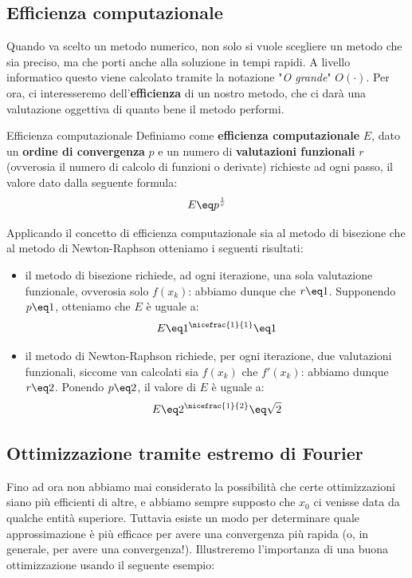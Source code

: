 \subsection{Efficienza computazionale}

Quando va scelto un metodo numerico, non solo si vuole scegliere un metodo che sia preciso, ma che porti anche alla soluzione in tempi rapidi. A livello informatico questo viene calcolato tramite la notazione "\textit{O grande}" $O(\cdot)$. Per ora, ci interesseremo dell'\textbf{efficienza} di un nostro metodo, che ci darà una valutazione oggettiva di quanto bene il metodo performi.

\begin{definition}{Efficienza computazionale}
    Definiamo come \textbf{efficienza computazionale} $E$, dato un \textbf{ordine di convergenza} $p$ e un numero di \textbf{valutazioni funzionali} $r$ (ovverosia il numero di calcolo di funzioni o derivate) richieste ad ogni passo, il valore dato dalla seguente formula:
    \[ E \eq p^{\frac{1}{r}} \]
\end{definition}

Applicando il concetto di efficienza computazionale sia al metodo di bisezione che al metodo di Newton-Raphson otteniamo i seguenti risultati:
\begin{itemize}
    \item il metodo di bisezione richiede, ad ogni iterazione, una sola valutazione funzionale, ovverosia solo $f(x_k)$: abbiamo dunque che $r \eq 1$. Supponendo $p \eq 1$, otteniamo che $E$ è uguale a:
    \[ E \eq 1^{\nicefrac{1}{1}} \eq 1 \]
    \item il metodo di Newton-Raphson richiede, per ogni iterazione, due valutazioni funzionali, siccome van calcolati sia $f(x_k)$ che $f'(x_k)$: abbiamo dunque $r \eq 2$. Ponendo $p \eq 2$, il valore di $E$ è uguale a:
    \[ E \eq 2^{\nicefrac{1}{2}} \eq \sqrt{2} \]
\end{itemize}

\subsection{Ottimizzazione tramite estremo di Fourier}

Fino ad ora non abbiamo mai considerato la possibilità che certe ottimizzazioni siano più efficienti di altre, e abbiamo sempre supposto che $x_0$ ci venisse data da qualche entità superiore. Tuttavia esiste un modo per determinare quale approssimazione è più efficace per avere una convergenza più rapida (o, in generale, per avere una convergenza!). Illustreremo l'importanza di una buona ottimizzazione usando il seguente esempio:

